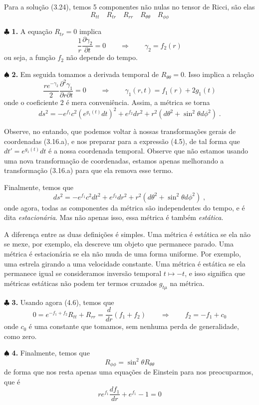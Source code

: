 \documentclass[11pt]{article}
\begin{document}
    Para a solução (3.24), temos 5 componentes não nulas no tensor de Ricci,
são elas
\[\tag{4.2} R_{tt}\quad R_{tr}\quad R_{rr}\quad R_{\theta\theta} \quad R_{\phi\phi}\]

    \(\clubsuit\) \textbf{1.} A equação \(R_{tr} = 0\) implica
\[\tag{4.3} \frac{1}{r}\frac{\partial \gamma_2}{\partial t} = 0 \qquad \Rightarrow \qquad \gamma_2=f_2(r)\]
ou seja, a função \(f_2\) não depende do tempo.

    \(\spadesuit\) \textbf{2.} Em seguida tomamos a derivada temporal de
\(R_{\theta\theta} = 0\). Isso implica a relação
\[\tag{4.4} \frac{r e^{-\gamma_2}}{2}\frac{\partial^2 \gamma_1}{\partial r \partial t} = 0 \qquad \Rightarrow \qquad \gamma_1(r,t)=f_1(r) + 2g_1(t)\]
onde o coeficiente \(2\) é mera conveniência. Assim, a métrica se torna
\[ \tag{4.5} ds^2 = - e^{f_1} c^2 (e^{g_1(t)}dt)^2 + e^{f_2}dr^2 + r^2 (d\theta^2 + \sin^2\theta d\phi^2)\; .\]

Observe, no entando, que podemos voltar à nossas transformações gerais
de coordenadas (3.16.a), e nos preparar para a expressão (4.5), de tal
forma que \(dt' = e^{g_1(t)}dt\) é a nossa coordenada temporal. Observe
que não estamos usando uma nova transformação de coordenadas, estamos
apenas melhorando a transformação (3.16.a) para que ela remova esse
termo.

Finalmente, temos que
\[ \tag{4.6} ds^2 = - e^{f_1} c^2 dt^2 + e^{f_2}dr^2 + r^2 (d\theta^2 + \sin^2\theta d\phi^2)\; ,\]
onde agora, todas as componentes da métrica são independentes do tempo,
e é dita \emph{estacionária}. Mas não apenas isso, essa métrica é também
\emph{estática}.

A diferença entre as duas definições é simples. Uma métrica é estática
se ela não se mexe, por exemplo, ela descreve um objeto que permanece
parado. Uma métrica é estacionária se ela não muda de uma forma
uniforme. Por exemplo, uma estrela girando a uma velocidade constante.
Uma métrica é estática se ela permanece igual se consideramos inversão
temporal \(t\mapsto -t\), e isso significa que métricas estáticas não
podem ter termos cruzados \(g_{t\mu}\) na métrica.

    \(\clubsuit\) \textbf{3.} Usando agora (4.6), temos que
\[\tag{4.7} 0 = e^{-f_1 + f_2}R_{tt} + R_{rr} = \frac{d}{dr}(f_1 + f_2)\qquad \Rightarrow \qquad  f_2 = -f_1 + c_0 \]
onde \(c_0\) é uma constante que tomamos, sem nenhuma perda de
generalidade, como zero.

    \(\spadesuit\) \textbf{4.} Finalmente, temos que
\[ \tag{4.8} R_{\phi\phi} = \sin^2 \theta R_{\theta\theta}\] de forma
que nos resta apenas uma equações de Einstein para nos preocuparmos, que
é \[ \tag{4.9} r e^{f_1} \frac{d f_1}{dr}  + e^{f_1} - 1 = 0  \]
\end{document}
